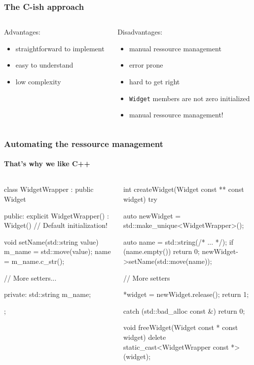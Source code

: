 \documentclass{beamer}
\def\code#1{\texttt{#1}}
\def\titleinframe#1{{\usebeamercolor[fg]{structure} #1}}
\begin{document}
\begin{frame}[fragile]
\frametitle{The C-ish approach}
\begin{columns}[T]
\begin{column}{0.45\textwidth}
	\titleinframe{Advantages:}
	\begin{itemize}
	\item straightforward to implement
	\item easy to understand
	\item low complexity
	\end{itemize}
\end{column}
\begin{column}{0.45\textwidth}
	\titleinframe{Disadvantages:}
	\begin{itemize}
	\item manual ressource management
	\item error prone
	\item hard to get right
	\item \code{Widget} members are not zero initialized
	\item manual ressource management!
	\end{itemize}
\end{column}
\end{columns}
\end{frame}


\begin{frame}[fragile]
\frametitle{Automating the ressource management}
\framesubtitle{That's why we like C++}
\begin{columns}
\begin{column}{0.45\textwidth}
\begin{TinyC++}
class WidgetWrapper : public Widget
{
public:
	explicit WidgetWrapper()
        : Widget()	// Default initialization!
	{}

	void setName(std::string value)
	{
		m_name = std::move(value);
		name = m_name.c_str();
	}

	// More setters...
	
private:
	std::string m_name;
};
\end{TinyC++}
\end{column}
\begin{column}{0.45\textwidth}
\begin{TinyC++}
int createWidget(Widget const ** const widget)
try
{
	auto newWidget = std::make_unique<WidgetWrapper>();
    
	auto name = std::string(/* ... */);
	if (name.empty())
	{
		return 0;
	}
	newWidget->setName(std::move(name));

	// More setters
    
	*widget = newWidget.release();
	return 1;
}
catch (std::bad_alloc const &)
{
	return 0;
}

void freeWidget(Widget const * const widget)
{
	delete static_cast<WidgetWrapper const *>(widget);
}
\end{TinyC++}
\end{column}
\end{columns}
\end{frame}
\end{document}
